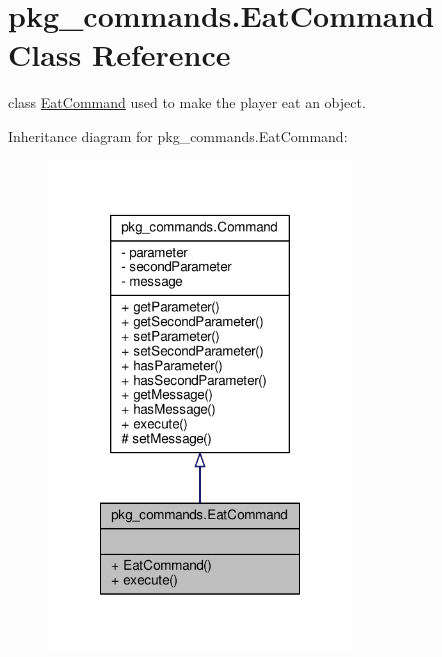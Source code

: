 \hypertarget{classpkg__commands_1_1EatCommand}{\section{pkg\-\_\-commands.\-Eat\-Command Class Reference}
\label{classpkg__commands_1_1EatCommand}
}


class \hyperlink{classpkg__commands_1_1EatCommand}{Eat\-Command} used to make the player eat an object.  




Inheritance diagram for pkg\-\_\-commands.\-Eat\-Command\-:
\nopagebreak
\begin{figure}[H]
\begin{center}
\leavevmode
\includegraphics[width=228pt]{classpkg__commands_1_1EatCommand__inherit__graph}
\end{center}
\end{figure}


